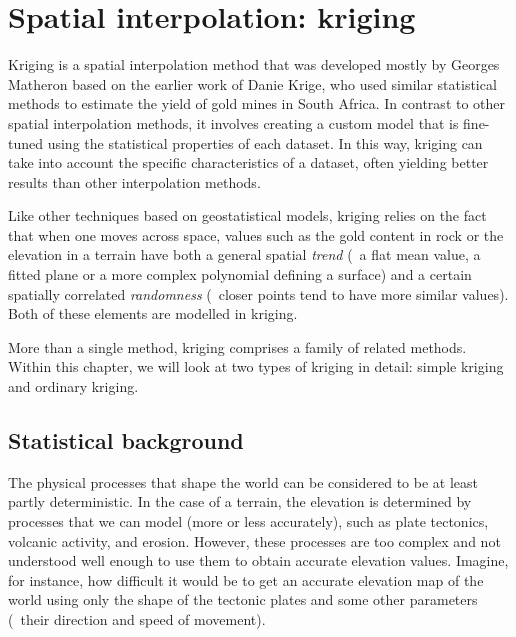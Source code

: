 
\graphicspath{{kriging/}}


\chapter{Spatial interpolation: kriging}%
\label{chap:kriging}

Kriging is a spatial interpolation method that was developed mostly by Georges Matheron based on the earlier work of Danie Krige, who used similar statistical methods to estimate the yield of gold mines in South Africa.
In contrast to other spatial interpolation methods, it involves creating a custom model that is fine-tuned using the statistical properties of each dataset.
In this way, kriging can take into account the specific characteristics of a dataset, often yielding better results than other interpolation methods.

Like other techniques based on geostatistical models, kriging relies on the fact that when one moves across space, values such as the gold content in rock or the elevation in a terrain have both a general spatial \emph{trend} (\eg\ a flat mean value, a fitted plane or a more complex polynomial defining a surface) and a certain spatially correlated \emph{randomness} (\ie\ closer points tend to have more similar values).
Both of these elements are modelled in kriging.

More than a single method, kriging comprises a family of related methods.
Within this chapter, we will look at two types of kriging in detail: simple kriging and ordinary kriging.

\section{Statistical background}

The physical processes that shape the world can be considered to be at least partly deterministic.
In the case of a terrain, the elevation is determined by processes that we can model (more or less accurately), such as plate tectonics, volcanic activity, and erosion.
However, these processes are too complex and not understood well enough to use them to obtain accurate elevation values.
Imagine, for instance, how difficult it would be to get an accurate elevation map of the world using only the shape of the tectonic plates and some other parameters (\eg\ their direction and speed of movement).

